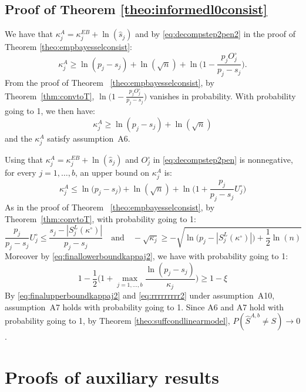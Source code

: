 \documentclass[aos]{imsart}
\theoremstyle{plain}
\begin{document}
\subsection{Proof of Theorem \ref{theo:informedl0consist}} We have that $\kappa_j^{A}=\kappa_j^{EB}+\ln(\widehat s_j)$ and by \eqref{eq:decompstep2pen2} in the proof of Theorem \ref{theo:empbayesselconsist}:
\begin{equation*}
    \kappa_j^{A}
    \geq  \ln(p_j-s_j)+\ln(\sqrt{n})+\ln\Big(1-\frac{p_j O^{\circ}_j}{p_j-s_j}\Big).
\end{equation*}
From the proof of Theorem ~\ref{theo:empbayesselconsist}, by Theorem~\ref{thm:convtoT}, $\ln\Big(1-\frac{p_j O^{\circ}_j}{p_j-s_j}\Big)$ vanishes in probability. With probability going to 1, we then have:
\begin{equation}\label{eq:finallowerboundkappaj2}\kappa^{A}_j 
    \geq  \ln(p_j-s_j)+\ln(\sqrt{n})
\end{equation}
and the $\kappa^{A}_j$ satisfy assumption~A6.

Using that $\kappa_j^{A}=\kappa_j^{EB}+\ln(\widehat s_j)$ and $O_j^{\circ}$ in \eqref{eq:decompstep2pen} is nonnegative, for every $j=1,\ldots,b$, an upper bound on $\kappa^{A}_j$ is:
\begin{equation*}
    \kappa^{A}_j \leq \ln\big(p_j-s_j\big)+\ln(\sqrt{n})+\ln\bigg(1+\frac{p_j}{p_j-s_j}U^{\circ}_j\bigg)
\end{equation*}
As in the proof of Theorem ~\ref{theo:empbayesselconsist}, by Theorem~\ref{thm:convtoT}, with probability going to 1:
\begin{equation}\label{eq:finalupperboundkappaj2}
    \frac{p_j}{p_j-s_j}U^{\circ}_j \leq \frac{s_j-|S^{L}_j(\kappa^{\circ})|}{p_j-s_j}\quad\text{and}\quad -\sqrt{\kappa_j} \geq -\sqrt{\ln\big(p_j-|S^{L}_j(\kappa^{\circ})|\big)+\frac{1}{2}\ln(n)}
\end{equation}
Moreover by \eqref{eq:finallowerboundkappaj2}, we have with probability going to 1:
\begin{equation}\label{eq:rrrrrrrrr2}
    1-\frac12\Big(1+\max_{j=1, \ldots,b}\frac{\ln(p_j-s_j)}{\kappa_j}\Big) \geq 1-\xi
\end{equation}
By \eqref{eq:finalupperboundkappaj2} and \eqref{eq:rrrrrrrrr2}  under assumption~A10, assumption~A7 holds with probability going to 1. Since A6 and A7 hold with probability going to 1, by Theorem \ref{theo:suffcondlinearmodel}, $P(\hat{S}^{A,b}\neq S) \to 0$.

\section{Proofs of auxiliary results}\label{sec:proofauxi}
\end{document}
